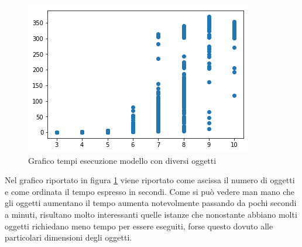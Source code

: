 \begin{figure}[!ht]
	\begin{center} \includegraphics[scale=0.8]{figures/time_nitems}
		\caption[Grafico tempi esecuzione]{Grafico tempi esecuzione modello con diversi oggetti}  
		\label{fig:times}
	\end{center}
\end{figure}

Nel grafico riportato in figura \ref{fig:times} viene riportato come ascissa il numero di oggetti e come ordinata il tempo espresso in secondi. 
Come si può vedere man mano che gli oggetti aumentano il tempo aumenta notevolmente passando da pochi secondi a minuti, risultano molto interessanti quelle istanze che nonostante abbiano molti oggetti richiedano meno tempo per essere eseguiti, forse questo dovuto alle particolari dimensioni degli oggetti.

